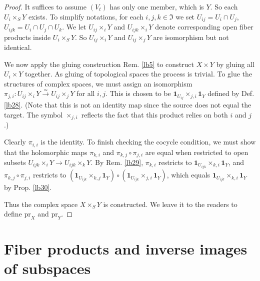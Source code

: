 \documentclass[12pt,b5paper,notitlepage]{report}
\theoremstyle{definition}
\theoremstyle{plain}
\newcommand{\fk}{\mathfrak}
\newcommand{\id}{\mathbf{1}}
\newcommand{\pr}{\mathrm {pr}}
\numberwithin{equation}{section}
\begin{document}
\begin{proof}
It suffices to assume $(V_t)$ has only one member, which is $Y$. So each $U_i\times_S Y$ exists. To simplify notations, for each $i,j,k\in\fk I$ we set $U_{ij}=U_i\cap U_j$, $U_{ijk}=U_i\cap U_j\cap U_k$. We let $U_{ij}\times_i Y$ and $U_{ijk}\times_i Y$ denote corresponding open fiber products inside $U_i\times_S Y$. So $U_{ij}\times_i Y$ and $U_{ij}\times_jY$ are isomorphism but not identical.

We now apply the gluing construction Rem. \ref{lb5} to construct $X\times Y$ by gluing all $U_i\times Y$ together. As gluing of topological spaces the process is trivial. To glue the structures of complex spaces, we must assign an isomorphism $\pi_{j,i}:U_{ij}\times_i Y\xrightarrow{\simeq}U_{ij}\times_jY$ for all $i,j$. This is chosen to be $\id_{U_{ij}}\times_{j,i}\id_Y$ defined by Def. \ref{lb28}. (Note that this is not an identity map since the source does not equal the target. The symbol $\times_{j,i}$ reflects the fact that this product relies on both $i$ and $j$.)

Clearly $\pi_{i,i}$ is the identity. To finish checking the cocycle condition, we must show that the holomorphic maps $\pi_{k,i}$ and  $\pi_{k,j}\circ\pi_{j,i}$ are equal  when restricted to open subsets $U_{ijk}\times_iY\rightarrow U_{ijk}\times_k Y$. By Rem. \ref{lb29}, $\pi_{k,i}$ restricts to $\id_{U_{ijk}}\times_{k,i} \id_Y$, and $\pi_{k,j}\circ\pi_{j,i}$ restricts to  $(\id_{U_{ijk}}\times_{k,j} \id_Y)\circ(\id_{U_{ijk}}\times_{j,i} \id_Y)$, which equals $\id_{U_{ijk}}\times_{k,i} \id_Y$ by Prop. \ref{lb30}. 

Thus the complex space $X\times_SY$ is constructed. We leave it to the readers to define $\pr_X$ and $\pr_Y$.
\end{proof}







\section{Fiber products and inverse images of subspaces}
\end{document}
